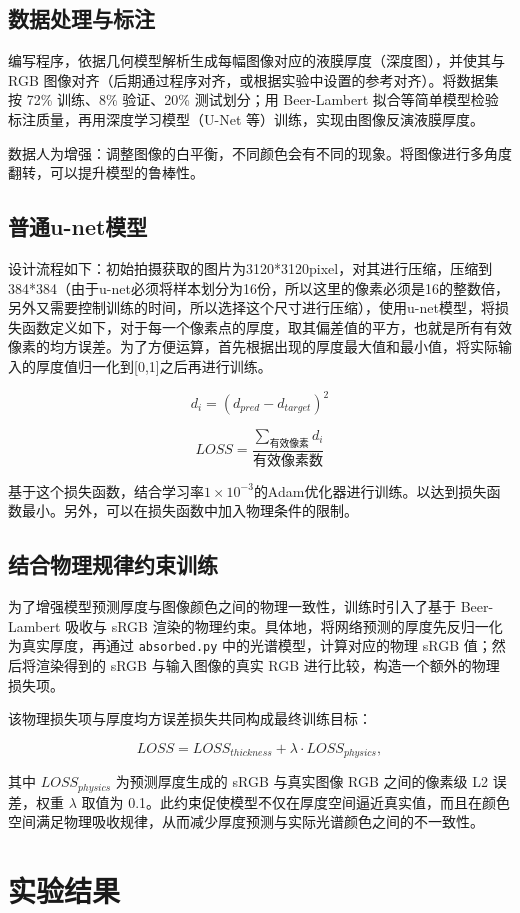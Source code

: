 \documentclass[11pt]{article}
\begin{document}
\subsection{数据处理与标注}
编写程序，依据几何模型解析生成每幅图像对应的液膜厚度（深度图），并使其与 RGB 图像对齐（后期通过程序对齐，或根据实验中设置的参考对齐）。将数据集按 72\% 训练、8\% 验证、20\% 测试划分；用 Beer-Lambert 拟合等简单模型检验标注质量，再用深度学习模型（U-Net 等）训练，实现由图像反演液膜厚度。

数据人为增强：调整图像的白平衡，不同颜色会有不同的现象。将图像进行多角度翻转，可以提升模型的鲁棒性。
\subsection{普通u-net模型}
设计流程如下：初始拍摄获取的图片为3120*3120pixel，对其进行压缩，压缩到384*384（由于u-net必须将样本划分为16份，所以这里的像素必须是16的整数倍，另外又需要控制训练的时间，所以选择这个尺寸进行压缩），使用u-net模型，将损失函数定义如下，对于每一个像素点的厚度，取其偏差值的平方，也就是所有有效像素的均方误差。为了方便运算，首先根据出现的厚度最大值和最小值，将实际输入的厚度值归一化到[0,1]之后再进行训练。

\[d_i=(d_{pred}-d_{target})^2\]

\[LOSS = \frac{\sum_{\text{有效像素}}d_i}{\text{有效像素数}} \]

基于这个损失函数，结合学习率$1\times 10^{-3}$的Adam优化器进行训练。以达到损失函数最小。另外，可以在损失函数中加入物理条件的限制。

\subsection{结合物理规律约束训练}
为了增强模型预测厚度与图像颜色之间的物理一致性，训练时引入了基于 Beer-Lambert 吸收与 sRGB 渲染的物理约束。具体地，将网络预测的厚度先反归一化为真实厚度，再通过 \texttt{absorbed.py} 中的光谱模型，计算对应的物理 sRGB 值；然后将渲染得到的 sRGB 与输入图像的真实 RGB 进行比较，构造一个额外的物理损失项。

该物理损失项与厚度均方误差损失共同构成最终训练目标：

\[LOSS = LOSS_{thickness} + \lambda \cdot LOSS_{physics},\]

其中 $LOSS_{physics}$ 为预测厚度生成的 sRGB 与真实图像 RGB 之间的像素级 L2 误差，权重 $\lambda$ 取值为 0.1。此约束促使模型不仅在厚度空间逼近真实值，而且在颜色空间满足物理吸收规律，从而减少厚度预测与实际光谱颜色之间的不一致性。

\section{实验结果}
\end{document}
